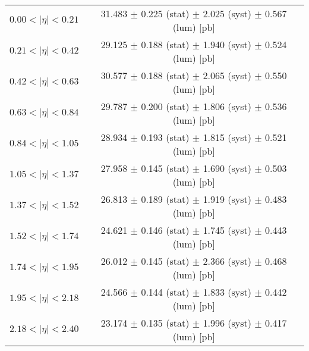 \begin{tabular}{lc}
\hline
$0.00 < |\eta| <0.21$          & 31.483 $\pm$ 0.225 (stat) $\pm$ 2.025 (syst) $\pm$ 0.567 (lum) [pb]  \\
$0.21 < |\eta| <0.42$          & 29.125 $\pm$ 0.188 (stat) $\pm$ 1.940 (syst) $\pm$ 0.524 (lum) [pb]  \\
$0.42 < |\eta| <0.63$          & 30.577 $\pm$ 0.188 (stat) $\pm$ 2.065 (syst) $\pm$ 0.550 (lum) [pb]  \\
$0.63 < |\eta| <0.84$          & 29.787 $\pm$ 0.200 (stat) $\pm$ 1.806 (syst) $\pm$ 0.536 (lum) [pb]  \\
$0.84 < |\eta| <1.05$          & 28.934 $\pm$ 0.193 (stat) $\pm$ 1.815 (syst) $\pm$ 0.521 (lum) [pb]  \\
$1.05 < |\eta| <1.37$          & 27.958 $\pm$ 0.145 (stat) $\pm$ 1.690 (syst) $\pm$ 0.503 (lum) [pb]  \\
$1.37 < |\eta| <1.52$          & 26.813 $\pm$ 0.189 (stat) $\pm$ 1.919 (syst) $\pm$ 0.483 (lum) [pb]  \\
$1.52 < |\eta| <1.74$          & 24.621 $\pm$ 0.146 (stat) $\pm$ 1.745 (syst) $\pm$ 0.443 (lum) [pb]  \\
$1.74 < |\eta| <1.95$          & 26.012 $\pm$ 0.145 (stat) $\pm$ 2.366 (syst) $\pm$ 0.468 (lum) [pb]  \\
$1.95 < |\eta| <2.18$          & 24.566 $\pm$ 0.144 (stat) $\pm$ 1.833 (syst) $\pm$ 0.442 (lum) [pb]  \\
$2.18 < |\eta| <2.40$          & 23.174 $\pm$ 0.135 (stat) $\pm$ 1.996 (syst) $\pm$ 0.417 (lum) [pb]  \\
\hline
\end{tabular}
